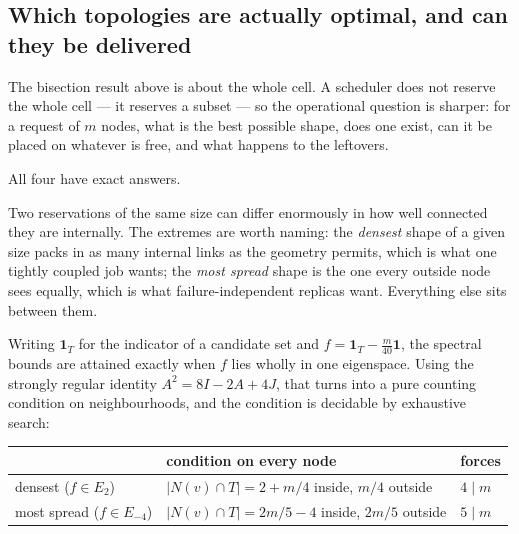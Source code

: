 \documentclass[11pt,letterpaper]{article}
\newcommand{\tagbox}[3]{\tikz[baseline=(X.base)]{\node[inner xsep=3.5pt,inner ysep=1.4pt,rounded corners=1.6pt,fill=#1,text=#2,font=\bfseries\sffamily\tiny] (X) {#3};}}
\newcommand{\PROVED}{\tagbox{greenlite}{green!45!black}{PROVED}}
\begin{document}
\subsection{Which topologies are actually optimal, and can they be delivered}

The bisection result above is about the whole cell. A scheduler does not reserve
the whole cell --- it reserves a subset --- so the operational question is
sharper: for a request of $m$ nodes, what is the best possible shape, does one
exist, can it be placed on whatever is free, and what happens to the leftovers.

All four have exact answers. \PROVED

\begin{plainbox}
Two reservations of the same size can differ enormously in how well connected
they are internally. The extremes are worth naming: the \emph{densest} shape of
a given size packs in as many internal links as the geometry permits, which is
what one tightly coupled job wants; the \emph{most spread} shape is the one
every outside node sees equally, which is what failure-independent replicas
want. Everything else sits between them.
\end{plainbox}

Writing $\mathbf 1_T$ for the indicator of a candidate set and
$f=\mathbf 1_T-\tfrac m{40}\mathbf 1$, the spectral bounds are attained exactly
when $f$ lies wholly in one eigenspace. Using the strongly regular identity
$A^2=8I-2A+4J$, that turns into a pure counting condition on neighbourhoods,
and the condition is decidable by exhaustive search:

\begin{center}
\renewcommand{\arraystretch}{1.25}
\begin{tabular}{lll}
\toprule
& \textbf{condition on every node} & \textbf{forces} \\
\midrule
densest ($f\in E_2$) & $|N(v)\cap T| = 2+m/4$ inside, $m/4$ outside & $4\mid m$ \\
most spread ($f\in E_{-4}$) & $|N(v)\cap T| = 2m/5-4$ inside, $2m/5$ outside & $5\mid m$ \\
\bottomrule
\end{tabular}
\end{center}
\end{document}
